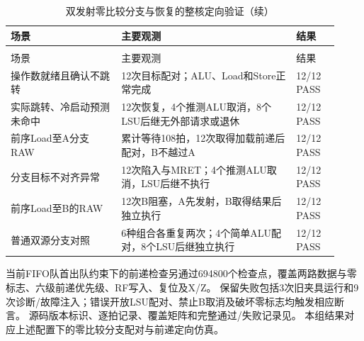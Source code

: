 \begin{reporttable}
\begin{longtable}{@{}p{0.31\linewidth}p{0.49\linewidth}p{0.12\linewidth}@{}}
\caption{双发射零比较分支与恢复的整核定向验证}\label{tbl:cpu-zero-pair-program}\\
\toprule
场景 & 主要观测 & 结果 \\
\midrule
\endfirsthead
\caption[]{双发射零比较分支与恢复的整核定向验证（续）}\\
\toprule
场景 & 主要观测 & 结果 \\
\midrule
\endhead
\bottomrule
\endfoot
操作数就绪且确认不跳转 & 12次目标配对；ALU、Load和Store正常完成 & 12/12 PASS \\
实际跳转、冷启动预测未命中 & 12次恢复，4个推测ALU取消，8个LSU后继无外部请求或退休 & 12/12 PASS \\
前序Load至A分支RAW & 累计等待108拍，12次取得加载前递后配对，B不越过A & 12/12 PASS \\
分支目标不对齐异常 & 12次陷入与MRET；4个推测ALU取消，LSU后继不执行 & 12/12 PASS \\
前序Load至B的RAW & 12次B阻塞，A先发射，B取得结果后独立执行 & 12/12 PASS \\
普通双源分支对照 & 6种组合各重复两次；4个简单ALU配对，8个LSU后继独立执行 & 12/12 PASS \\
\end{longtable}
\end{reporttable}

当前FIFO队首出队约束下的前递检查另通过694800个检查点，覆盖两路数据与零标志、六级前递优先级、RF写入、复位及X/Z。
保留失败包括3次旧夹具运行和9次诊断/故障注入；错误开放LSU配对、禁止B取消及破坏零标志均触发相应断言。
源码版本标识、逐拍记录、覆盖矩阵和完整通过/失败记录见。
本组结果对应上述配置下的零比较分支配对与前递定向仿真。

